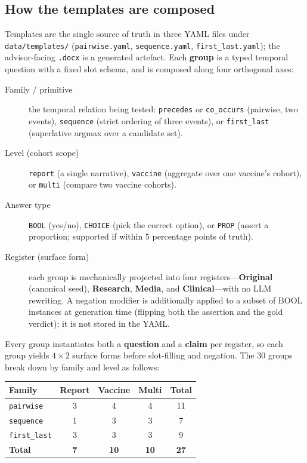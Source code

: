 \documentclass[11pt]{article}
\begin{document}
\subsection{How the templates are composed}
Templates are the single source of truth in three YAML files under
\texttt{data/templates/} (\texttt{pairwise.yaml}, \texttt{sequence.yaml},
\texttt{first\_last.yaml}); the advisor-facing \texttt{.docx} is a generated artefact.
Each \textbf{group} is a typed temporal question with a fixed slot schema, and is composed
along four orthogonal axes:
\begin{description}
  \item[Family / primitive] the temporal relation being tested:
  \texttt{precedes} or \texttt{co\_occurs} (pairwise, two events), \texttt{sequence}
  (strict ordering of three events), or \texttt{first\_last} (superlative argmax over a
  candidate set).
  \item[Level (cohort scope)] \texttt{report} (a single narrative), \texttt{vaccine}
  (aggregate over one vaccine's cohort), or \texttt{multi} (compare two vaccine cohorts).
  \item[Answer type] \texttt{BOOL} (yes/no), \texttt{CHOICE} (pick the correct option),
  or \texttt{PROP} (assert a proportion; supported if within 5 percentage points of truth).
  \item[Register (surface form)] each group is mechanically projected into four
  registers---\textbf{Original} (canonical seed), \textbf{Research}, \textbf{Media}, and
  \textbf{Clinical}---with no LLM rewriting. A negation modifier is additionally applied to
  a subset of BOOL instances at generation time (flipping both the assertion and the gold
  verdict); it is not stored in the YAML.
\end{description}
Every group instantiates both a \textbf{question} and a \textbf{claim} per register, so each group yields $4\times2$ surface forms before slot-filling and negation. The $30$ groups break down by family and level as follows:
\begin{center}
\begin{tabular}{@{}lcccc@{}}
\toprule
\textbf{Family} & \textbf{Report} & \textbf{Vaccine} & \textbf{Multi} & \textbf{Total} \\
\midrule
\texttt{pairwise} & 3 & 4 & 4 & 11 \\
\texttt{sequence} & 1 & 3 & 3 & 7 \\
\texttt{first\_last} & 3 & 3 & 3 & 9 \\
\midrule
\textbf{Total} & \textbf{7} & \textbf{10} & \textbf{10} & \textbf{27} \\
\bottomrule
\end{tabular}
\end{center}
\end{document}
